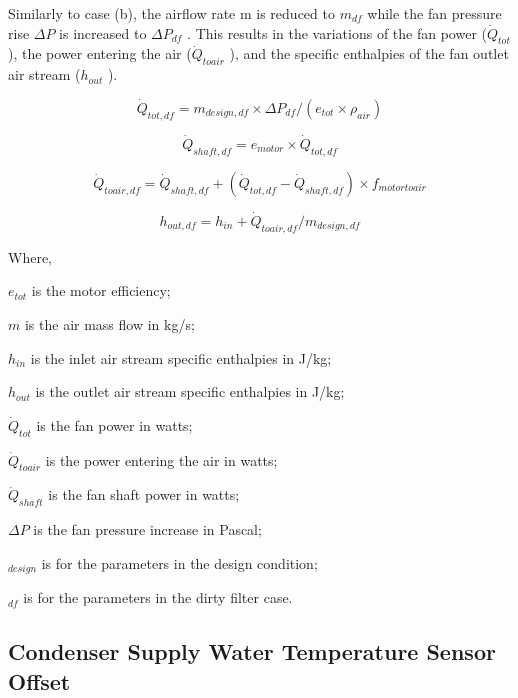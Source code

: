 Similarly to case (b), the airflow rate m is reduced to \(m_{df}\) while the fan pressure rise \(\Delta P\) is increased to \(\Delta P_{df}\) . This results in the variations of the fan power (\(\dot Q_{tot}\) ), the power entering the air (\(\dot Q_{toair}\) ), and the specific enthalpies of the fan outlet air stream (\(h_{out}\) ).

\begin{equation}
\dot{Q}_{tot,df} = m_{design,df} \times \Delta P_{df} / (e_{tot} \times \rho_{air} )
\end{equation}

\begin{equation}
\dot{Q}_{shaft,df} = e_{motor} \times \dot{Q}_{tot, df}
\end{equation}

\begin{equation}
\dot{Q}_{toair,df} = \dot{Q}_{shaft,df} +( \dot{Q}_{tot,df} - \dot{Q}_{shaft,df}) \times f_{motortoair}
\end{equation}

\begin{equation}
h_{out,df} = h_{in} + \dot{Q}_{toair,df} / m_{design,df}
\end{equation}

Where,

\(e_{tot}\) is the motor efficiency;

\(m\) is the air mass flow in kg/s;

\(h_{in}\) is the inlet air stream specific enthalpies in J/kg;

\(h_{out}\) is the outlet air stream specific enthalpies in J/kg;

\(\dot{Q}_{tot}\) is the fan power in watts;

\(\dot{Q}_{toair}\) is the power entering the air in watts;

\(\dot{Q}_{shaft}\) is the fan shaft power in watts;

\(\Delta P\) is the fan pressure increase in Pascal;

\(_{design}\) is for the parameters in the design condition;

\(_{df}\) is for the parameters in the dirty filter case.


\subsection{Condenser Supply Water Temperature Sensor Offset}\label{condenser-supply-water-temperature-sensor-offset}

